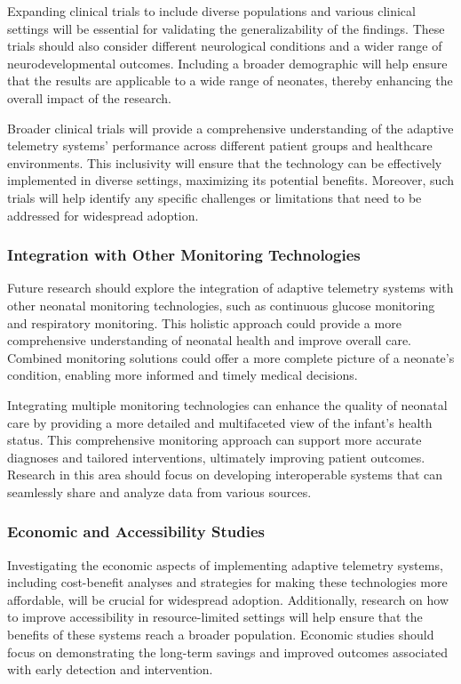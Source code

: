 \documentclass[12pt,journal,compsoc]{IEEEtran}
\begin{document}
Expanding clinical trials to include diverse populations and various clinical settings will be essential for validating the generalizability of the findings. These trials should also consider different neurological conditions and a wider range of neurodevelopmental outcomes. Including a broader demographic will help ensure that the results are applicable to a wide range of neonates, thereby enhancing the overall impact of the research.

Broader clinical trials will provide a comprehensive understanding of the adaptive telemetry systems' performance across different patient groups and healthcare environments. This inclusivity will ensure that the technology can be effectively implemented in diverse settings, maximizing its potential benefits. Moreover, such trials will help identify any specific challenges or limitations that need to be addressed for widespread adoption.

\subsubsection{Integration with Other Monitoring Technologies}

Future research should explore the integration of adaptive telemetry systems with other neonatal monitoring technologies, such as continuous glucose monitoring and respiratory monitoring. This holistic approach could provide a more comprehensive understanding of neonatal health and improve overall care. Combined monitoring solutions could offer a more complete picture of a neonate's condition, enabling more informed and timely medical decisions.

Integrating multiple monitoring technologies can enhance the quality of neonatal care by providing a more detailed and multifaceted view of the infant's health status. This comprehensive monitoring approach can support more accurate diagnoses and tailored interventions, ultimately improving patient outcomes. Research in this area should focus on developing interoperable systems that can seamlessly share and analyze data from various sources.

\subsubsection{Economic and Accessibility Studies}

Investigating the economic aspects of implementing adaptive telemetry systems, including cost-benefit analyses and strategies for making these technologies more affordable, will be crucial for widespread adoption. Additionally, research on how to improve accessibility in resource-limited settings will help ensure that the benefits of these systems reach a broader population. Economic studies should focus on demonstrating the long-term savings and improved outcomes associated with early detection and intervention.
\end{document}

